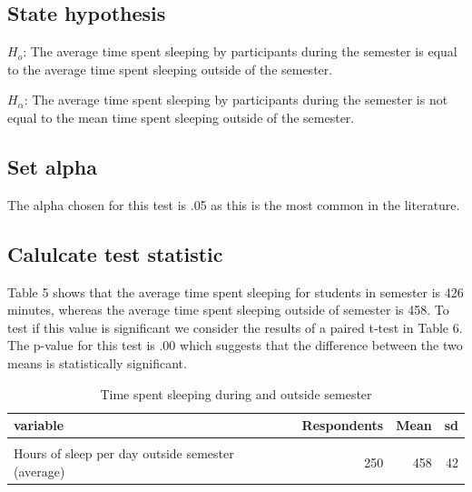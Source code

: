 \documentclass[preprint, 3p,
authoryear]{elsarticle} %
\begin{document}
\hypertarget{state-hypothesis-1}{%
\subsection{State hypothesis}\label{state-hypothesis-1}}

\(H_o\): The average time spent sleeping by participants during the
semester is equal to the average time spent sleeping outside of the
semester.

\(H_\alpha\): The average time spent sleeping by participants during the
semester is not equal to the mean time spent sleeping outside of the
semester.

\hypertarget{set-alpha-1}{%
\subsection{Set alpha}\label{set-alpha-1}}

The alpha chosen for this test is .05 as this is the most common in the
literature.

\hypertarget{calulcate-test-statistic-1}{%
\subsection{Calulcate test statistic}\label{calulcate-test-statistic-1}}

Table 5 shows that the average time spent sleeping for students in
semester is 426 minutes, whereas the average time spent sleeping outside
of semester is 458. To test if this value is significant we consider the
results of a paired t-test in Table 6. The p-value for this test is .00
which suggests that the difference between the two means is
statistically significant.

\begin{table}

\caption{\label{tab:unnamed-chunk-7}Time spent sleeping during and outside semester}
\centering
\fontsize{7}{9}\selectfont
\begin{tabular}[t]{l|r|r|r}
\hline
\textbf{variable} & \textbf{Respondents} & \textbf{Mean} & \textbf{sd}\\
\hline
\cellcolor{gray!6}{Hours of sleep per day during semester (average)} & \cellcolor{gray!6}{250} & \cellcolor{gray!6}{426} & \cellcolor{gray!6}{45}\\
\hline
Hours of sleep per day outside semester (average) & 250 & 458 & 42\\
\hline
\end{tabular}
\end{table}
\end{document}
